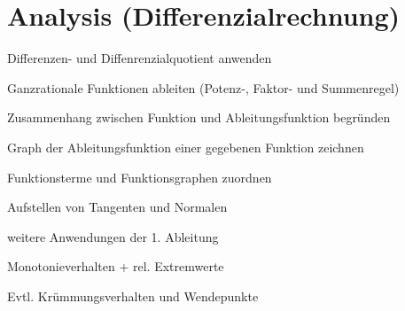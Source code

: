 \documentclass[
    ngerman,
    color=1b,
    load_common,
    leqno,
    boxarc,
]{rubos-tuda-template}
\begin{document}
\section*{Analysis (Differenzialrechnung)}
\begin{task}[points=1]{Differenzen- und Diffenrenzialquotient anwenden}
    
\end{task}
\begin{task}[points=1]{Ganzrationale Funktionen ableiten (Potenz-, Faktor- und Summenregel)}
    
\end{task}
\begin{task}[points=1]{Zusammenhang zwischen Funktion und Ableitungsfunktion begründen}
    
\end{task}
\begin{task}[points=1]{Graph der Ableitungsfunktion einer gegebenen Funktion zeichnen}
    
\end{task}
\begin{task}[points=1]{Funktionsterme und Funktionsgraphen zuordnen}
    
\end{task}
\begin{task}[points=1]{Aufstellen von Tangenten und Normalen}
    
\end{task}
\begin{task}[points=1]{weitere Anwendungen der 1. Ableitung}
    
\end{task}
\begin{task}[points=1]{Monotonieverhalten + rel. Extremwerte}
    
\end{task}
\begin{task}[points=1]{Evtl. Krümmungsverhalten und Wendepunkte}
    
\end{task}
    
    
\end{document}
